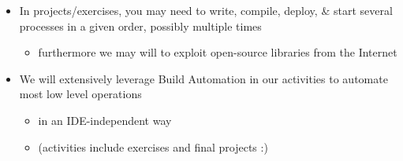 \documentclass[presentation]{beamer}\mode<presentation>{\usetheme{AMSBolognaFC}}
\begin{document}
\begin{frame}[allowframebreaks]
\begin{itemize}
        \framebreak

        \item In projects/exercises, you may need to write, compile, \alert{deploy}, \& start several processes in a given \alert{order}, possibly multiple \alert{times}
        \begin{itemize}
            \item furthermore we may will to exploit \alert{open-source libraries} from the Internet
        \end{itemize}

        \bigskip


        \item We will extensively leverage \alert{Build Automation} in our activities to automate most low level operations
        \begin{itemize}
            \item in an IDE-independent way
            \item (activities include exercises and final projects :)
        \end{itemize}

    \end{itemize}

\end{frame}







\end{document}
